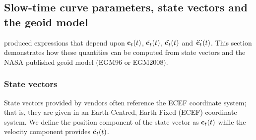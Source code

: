 \subsection{Slow-time curve parameters, state vectors and the geoid model}
\label{sc:svgeoid}
 produced expressions that depend upon $\mathbf{c}_t(t)$, $\dot{\mathbf{c}_t}(t)$, $\ddot{\mathbf{c}_t}(t)$ and $\dddot{\mathbf{c}_t}(t)$. This section demonstrates how these quantities can be computed from state vectors and the NASA published geoid model (EGM96 or EGM2008).
\subsubsection{State vectors}
State vectors provided by vendors often reference the ECEF coordinate system; that is, they are given in an Earth-Centred, Earth Fixed (ECEF) coordinate system. We define the position component of the state vector as $\mathbf{c}_t(t)$ while the velocity component provides $\dot{\mathbf{c}_t}(t)$.
